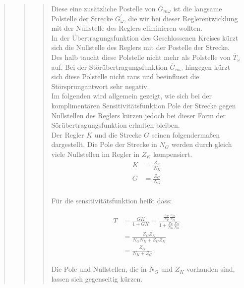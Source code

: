 \begin{quote}
\begin{quote}
\begin{quote}
            Diese eine zusätzliche Postelle von $\overline{G}_{m\omega}$ ist die langsame Polstelle der Strecke
            $G_\omega^{'}$, die wir bei dieser Reglerentwicklung mit der Nullstelle des Reglers eliminieren wollten.\\
            In der Übertragungsfunktion des Geschlossenen Kreises kürzt sich die Nullstelle des Reglers mit der
            Postelle der Strecke. Des halb taucht diese Polstelle nicht mehr als Polstelle von $\overline{T}_\omega$
            auf. Bei der Störübertragungsfunktion $\overline{G}_{m\omega}$ hingegen kürzt sich diese Polstelle nicht
            raus und beeinflusst die Störsprungantwort sehr negativ.\\
            
            
            Im folgenden wird allgemein gezeigt, wie sich bei der komplimentären Sensitivitätsfunktion Pole der Strecke
            gegen Nullstellen des Reglers kürzen jedoch bei dieser Form der Sörübertragungsfunktion erhalten bleiben.\\
            Der Regler $K$ und die Strecke $G$ seinen folgendermaßen dargestellt. Die Pole der Strecke in $N_G$ werden
            durch gleich viele Nullstellen im Regler in $Z_K$ kompensiert.
            \begin{equation*}
            	\begin{split}
            		K &= \frac{Z_K}{N_K}\\
            		G &= \frac{Z_G}{N_G}\\
            	\end{split}
            \end{equation*}
            
            Für die sensitivitätsfunktion heißt dass:
            
            \begin{equation*}
            	\begin{split}
                    T &= \frac{GK}{1+GK} = \frac{\frac{Z_K}{N_K} \frac{Z_G}{N_G}}{1 + \frac{Z_K}{N_K}
                    \frac{Z_G}{N_G}}\\
                    &= \frac{Z_G Z_K}{N_G N_K + Z_G Z_K}\\
                    &= \frac{Z_G}{N_K + Z_G}
            	\end{split}
            \end{equation*}
                        
            Die Pole und Nullstellen, die in $N_G$ und $Z_K$ vorhanden sind, lassen sich gegenseitig kürzen.\\
            

\end{quote}
\end{quote}
\end{quote}
